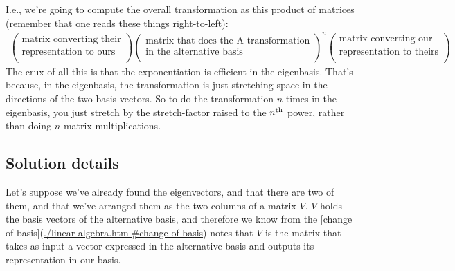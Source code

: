 I.e., we're going to compute the overall transformation as this product of
matrices (remember that one reads these things right-to-left):
\begin{align*}
  \begin{pmatrix}\text{matrix converting their}\\\text{representation to ours} \\ \end{pmatrix}
  \begin{pmatrix}\text{matrix that does the A transformation}\\\text{in the alternative basis} \\ \end{pmatrix}^n
  \begin{pmatrix}\text{matrix converting our}\\\text{representation to theirs} \\ \end{pmatrix}
\end{align*}
The crux of all this is that the exponentiation is efficient in the
eigenbasis. That's because, in the eigenbasis, the transformation is just
stretching space in the directions of the two basis vectors. So to do the
transformation $n$ times in the eigenbasis, you just stretch by the
stretch-factor raised to the $n^{\text{th}}$ power, rather than doing $n$ matrix
multiplications.

\subsection*{Solution details}

Let's suppose we've already found the eigenvectors, and that there are two of
them, and that we've arranged them as the two columns of a matrix $V$. $V$ holds
the basis vectors of the alternative basis, and therefore we know from the
[change of basis](\url{./linear-algebra.html#change-of-basis}) notes that $V$ is the
matrix that takes as input a vector expressed in the alternative basis and
outputs its representation in our basis.

